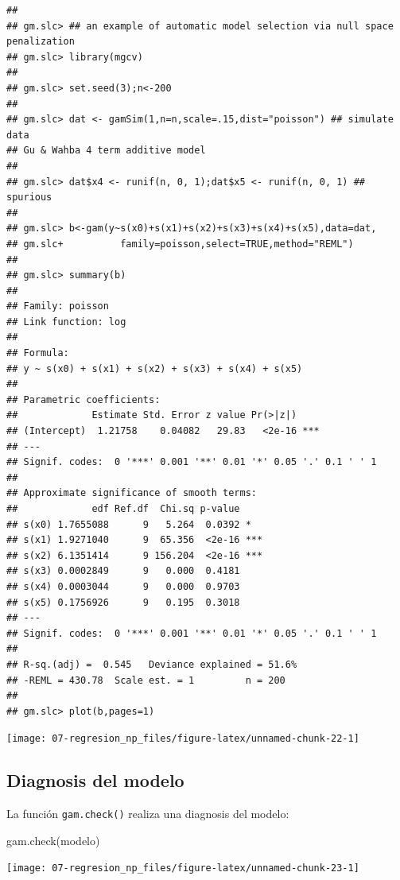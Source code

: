 \documentclass[
  spanish,
]{book}
\newenvironment{Shaded}{\begin{snugshade}}{\end{snugshade}}
\newcommand{\FunctionTok}[1]{\textcolor[rgb]{0.00,0.00,0.00}{#1}}
\newcommand{\NormalTok}[1]{#1}
\theoremstyle{break}
\theoremstyle{definition}
\theoremstyle{definition}
\theoremstyle{definition}
\theoremstyle{definition}
\theoremstyle{remark}
\begin{document}
\begin{verbatim}
## 
## gm.slc> ## an example of automatic model selection via null space penalization
## gm.slc> library(mgcv)
## 
## gm.slc> set.seed(3);n<-200
## 
## gm.slc> dat <- gamSim(1,n=n,scale=.15,dist="poisson") ## simulate data
## Gu & Wahba 4 term additive model
## 
## gm.slc> dat$x4 <- runif(n, 0, 1);dat$x5 <- runif(n, 0, 1) ## spurious
## 
## gm.slc> b<-gam(y~s(x0)+s(x1)+s(x2)+s(x3)+s(x4)+s(x5),data=dat,
## gm.slc+          family=poisson,select=TRUE,method="REML")
## 
## gm.slc> summary(b)
## 
## Family: poisson 
## Link function: log 
## 
## Formula:
## y ~ s(x0) + s(x1) + s(x2) + s(x3) + s(x4) + s(x5)
## 
## Parametric coefficients:
##             Estimate Std. Error z value Pr(>|z|)    
## (Intercept)  1.21758    0.04082   29.83   <2e-16 ***
## ---
## Signif. codes:  0 '***' 0.001 '**' 0.01 '*' 0.05 '.' 0.1 ' ' 1
## 
## Approximate significance of smooth terms:
##             edf Ref.df  Chi.sq p-value    
## s(x0) 1.7655088      9   5.264  0.0392 *  
## s(x1) 1.9271040      9  65.356  <2e-16 ***
## s(x2) 6.1351414      9 156.204  <2e-16 ***
## s(x3) 0.0002849      9   0.000  0.4181    
## s(x4) 0.0003044      9   0.000  0.9703    
## s(x5) 0.1756926      9   0.195  0.3018    
## ---
## Signif. codes:  0 '***' 0.001 '**' 0.01 '*' 0.05 '.' 0.1 ' ' 1
## 
## R-sq.(adj) =  0.545   Deviance explained = 51.6%
## -REML = 430.78  Scale est. = 1         n = 200
## 
## gm.slc> plot(b,pages=1)
\end{verbatim}

\begin{center}\texttt{[image: 07-regresion\_np\_files/figure-latex/unnamed-chunk-22-1]} \end{center}

\hypertarget{mgcv-diagnosis}{%
\subsection{Diagnosis del modelo}\label{mgcv-diagnosis}}

La función \texttt{gam.check()} realiza una diagnosis del modelo:

\begin{Shaded}
\begin{Highlighting}[]
\FunctionTok{gam.check}\NormalTok{(modelo)}
\end{Highlighting}
\end{Shaded}

\begin{center}\texttt{[image: 07-regresion\_np\_files/figure-latex/unnamed-chunk-23-1]} \end{center}
\end{document}
